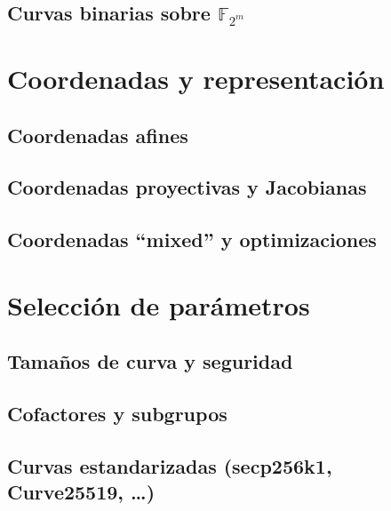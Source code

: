 \subsection{Curvas binarias sobre \texorpdfstring{$\mathbb{F}_{2^m}$}{F2m}}

\section{Coordenadas y representación}
\subsection{Coordenadas afines}
\subsection{Coordenadas proyectivas y Jacobianas}
\subsection{Coordenadas “mixed” y optimizaciones}

\section{Selección de parámetros}
\subsection{Tamaños de curva y seguridad}
\subsection{Cofactores y subgrupos}
\subsection{Curvas estandarizadas (secp256k1, Curve25519, …)}